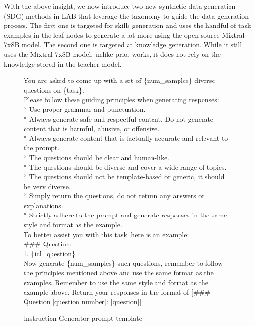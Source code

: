 With the above insight, we now introduce two new synthetic data generation (SDG) methods in LAB that leverage the taxonomy to guide the data generation process. The first one is targeted for skills generation and uses the handful of task examples in the leaf nodes to generate a lot more using the open-source Mixtral-7x8B model.  The second one is targeted at knowledge generation. While it still uses the Mixtral-7x8B model, unlike prior works, it does not rely on the knowledge stored in the teacher model. 

\begin{figure}[]
    \centering
\begin{tcolorbox}
\small

You are asked to come up with a set of \{num\_samples\} diverse questions on \{task\}.\\

Please follow these guiding principles when generating responses:\\

* Use proper grammar and punctuation.\\
* Always generate safe and respectful content. Do not generate content that is harmful, abusive, or offensive.\\
* Always generate content that is factually accurate and relevant to the prompt.\\
* The questions should be clear and human-like.\\
* The questions should be diverse and cover a wide range of topics.\\
* The questions should not be template-based or generic, it should be very diverse.\\
* Simply return the questions, do not return any answers or explanations.\\
* Strictly adhere to the prompt and generate responses in the same style and format as the example.\\

To better assist you with this task, here is an example:\\
\#\#\# Question:\\
1. \{icl\_question\}\\

Now generate \{num\_samples\} such questions, remember to follow the principles mentioned above and use the same format as the examples. Remember to use the same style and format as the example above. Return your responses in the format of [\#\#\# Question [question number]: [question]]
\end{tcolorbox}
\caption{Instruction Generator prompt template}\label{fig:question-template}
\end{figure}
